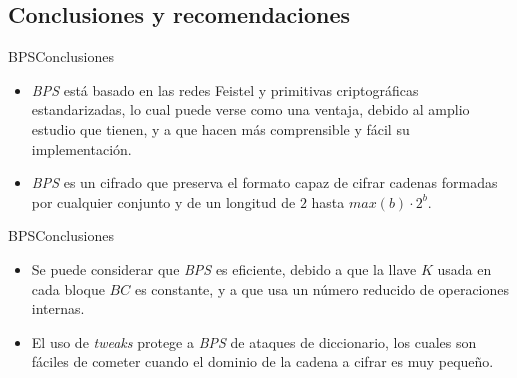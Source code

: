%
%

\subsection{Conclusiones y recomendaciones}

\begin{frame}{BPS}{Conclusiones}

  \begin{itemize}
    \item \textit{BPS} está basado en las redes Feistel y primitivas
      criptográficas estandarizadas, lo cual puede verse como una ventaja,
      debido al amplio estudio que tienen, y a que hacen más comprensible
      y fácil su implementación.

    \item \textit{BPS} es un cifrado que preserva el formato capaz de cifrar
      cadenas formadas por cualquier conjunto y de un longitud de $2$ hasta
      $max(b) \cdot 2^{b}$.
  \end{itemize}

\end{frame}

\begin{frame}{BPS}{Conclusiones}

  \begin{itemize}
    \item Se puede considerar que \textit{BPS} es eficiente, debido a que la
      llave $K$ usada en cada bloque $BC$ es constante, y a que usa un número
      reducido de operaciones internas.

    \item El uso de \textit{tweaks} protege a \textit{BPS} de ataques de
      diccionario, los cuales son fáciles de cometer cuando el dominio de la
      cadena a cifrar es muy pequeño.
  \end{itemize}

\end{frame}


